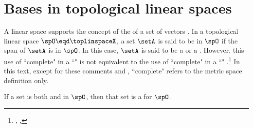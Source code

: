 \section{Bases in topological linear spaces}
A linear space supports the concept of the  of a set of vectors .
In a topological linear space $\spO\eqd\toplinspaceX$, a set $\setA$ is said to be  in $\spO$
if the span of $\setA$ is  in $\spO$.
In this case, $\setA$ is said to be a  or a .
However, this use of ``complete" in a ``" is not equivalent to 
the use of ``complete" in a ``" .\footnote{%
  ,
  ,
  }
In this text, except for these comments and , 
``complete" refers to the metric space definition  only.


If a set is both  and   in $\spO$, then 
that set is a   for $\spO$.

